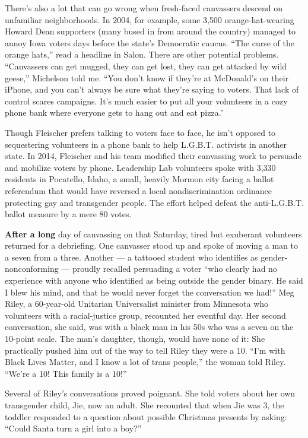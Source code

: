There's also a lot that can go wrong when fresh-faced canvassers descend
on unfamiliar neighborhoods. In 2004, for example, some 3,500
orange-hat-wearing Howard Dean supporters (many bused in from around the
country) managed to annoy Iowa voters days before the state's Democratic
caucus. ``The curse of the orange hats,'' read a headline in Salon.
There are other potential problems. ``Canvassers can get mugged, they
can get lost, they can get attacked by wild geese,'' Michelson told me.
``You don't know if they're at McDonald's on their iPhone, and you can't
always be sure what they're saying to voters. That lack of control
scares campaigns. It's much easier to put all your volunteers in a cozy
phone bank where everyone gets to hang out and eat pizza.''

Though Fleischer prefers talking to voters face to face, he isn't
opposed to sequestering volunteers in a phone bank to help L.G.B.T.
activists in another state. In 2014, Fleischer and his team modified
their canvassing work to persuade and mobilize voters by phone.
Leadership Lab volunteers spoke with 3,330 residents in Pocatello,
Idaho, a small, heavily Mormon city facing a ballot referendum that
would have reversed a local nondiscrimination ordinance protecting gay
and transgender people. The effort helped defeat the anti-L.G.B.T.
ballot measure by a mere 80 votes.

\textbf{After a long} day of canvassing on that Saturday, tired but
exuberant volunteers returned for a debriefing. One canvasser stood up
and spoke of moving a man to a seven from a three. Another --- a
tattooed student who identifies as gender-nonconforming --- proudly
recalled persuading a voter ``who clearly had no experience with anyone
who identified as being outside the gender binary. He said I blew his
mind, and that he would never forget the conversation we had!'' Meg
Riley, a 60-year-old Unitarian Universalist minister from Minnesota who
volunteers with a racial-justice group, recounted her eventful day. Her
second conversation, she said, was with a black man in his 50s who was a
seven on the 10-point scale. The man's daughter, though, would have none
of it: She practically pushed him out of the way to tell Riley they were
a 10. ``I'm with Black Lives Matter, and I know a lot of trans people,''
the woman told Riley. ``We're a 10! This family is a 10!''

Several of Riley's conversations proved poignant. She told voters about
her own transgender child, Jie, now an adult. She recounted that when
Jie was 3, the toddler responded to a question about possible Christmas
presents by asking: ``Could Santa turn a girl into a boy?''

